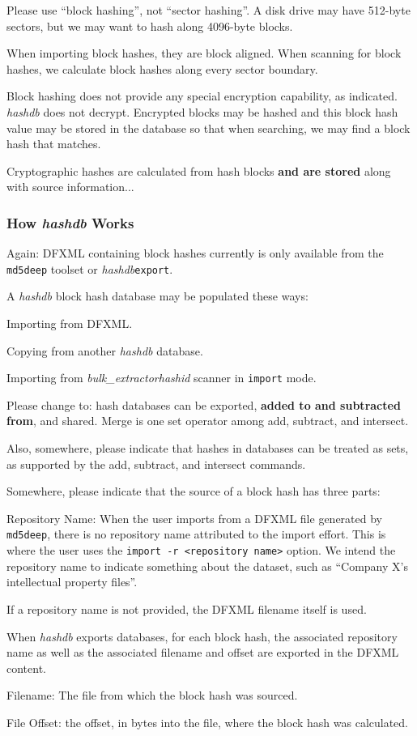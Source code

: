 \documentclass[12pt,twoside]{article}
\newcommand{\hdb}{\emph{hashdb}\xspace}
\newcommand{\bulk}{\emph{bulk\_extractor}\xspace}
\newcommand{\hid}{\emph{hashid}\xspace}
\begin{document}
Please use ``block hashing'', not ``sector hashing''.
A disk drive may have 512-byte sectors,
but we may want to hash along 4096-byte blocks.

When importing block hashes, they are block aligned.
When scanning for block hashes,
we calculate block hashes along every sector boundary.

Block hashing does not provide any special encryption capability, as indicated.
\hdb does not decrypt.
Encrypted blocks may be hashed
and this block hash value may be stored in the database
so that when searching, we may find a block hash that matches.

Cryptographic hashes are calculated from hash blocks
\textbf{and are stored} along with source information...

\subsubsection*{How \hdb Works}
Again: DFXML containing block hashes currently is only available
from the \texttt{md5deep} toolset or \hdb \texttt{export}.

A \hdb block hash database may be populated these ways:
\begin{compactitem}
\item Importing from DFXML.
\item Copying from another \hdb database.
\item Importing from \bulk \hid scanner in \texttt{import} mode.
\end{compactitem}

Please change to: hash databases can be exported,
\textbf{added to and subtracted from}, and shared.
Merge is one set operator among add, subtract, and intersect.

Also, somewhere, please indicate that hashes in databases can be treated
as sets, as supported by the add, subtract, and intersect commands.

Somewhere, please indicate that the source of a block hash has three parts:
\begin{compactitem}
\item Repository Name:  When the user imports from a DFXML file
generated by \texttt{md5deep},
there is no repository name attributed to the import effort.
This is where the user uses the \texttt{import -r <repository name>} option.
We intend the repository name to indicate something about the dataset,
such as ``Company X's intellectual property files''.

If a repository name is not provided, the DFXML filename itself is used.

When \hdb exports databases, for each block hash,
the associated repository name as well as the associated filename and offset
are exported in the DFXML content.

\item Filename: The file from which the block hash was sourced.
\item File Offset: the offset, in bytes into the file,
where the block hash was calculated.
\end{compactitem}
\end{document}
